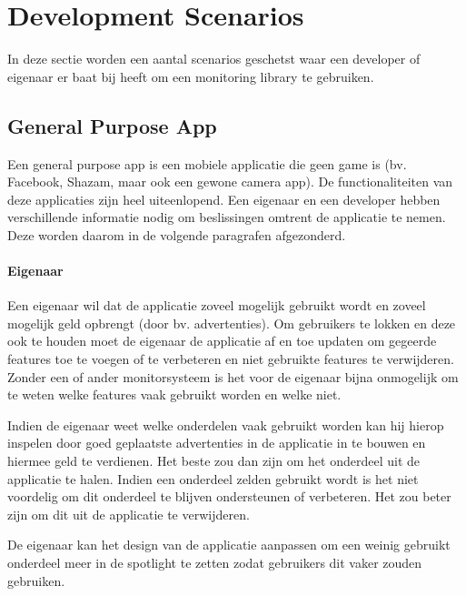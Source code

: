 \section{Development Scenarios}
In deze sectie worden een aantal scenarios geschetst waar een developer of eigenaar er baat bij heeft om een monitoring library te gebruiken. 

\subsection{General Purpose App}
Een general purpose app is een mobiele applicatie die geen game is (bv. Facebook, Shazam, maar ook een gewone camera app). De functionaliteiten van deze applicaties zijn heel uiteenlopend. Een eigenaar en een developer hebben verschillende informatie nodig om beslissingen omtrent de applicatie te nemen. Deze worden daarom in de volgende paragrafen afgezonderd.

\paragraph{Eigenaar}
Een eigenaar wil dat de applicatie zoveel mogelijk gebruikt wordt en zoveel mogelijk geld opbrengt (door bv. advertenties). Om gebruikers te lokken en deze ook te houden moet de eigenaar de applicatie af en toe updaten om gegeerde features toe te voegen of te verbeteren en niet gebruikte features te verwijderen. Zonder een of ander monitorsysteem is het voor de eigenaar bijna onmogelijk om te weten welke features vaak gebruikt worden en welke niet. 

Indien de eigenaar weet welke onderdelen vaak gebruikt worden kan hij hierop inspelen door goed geplaatste advertenties in de applicatie in te bouwen en hiermee geld te verdienen. Het beste zou dan zijn om het onderdeel uit de applicatie te halen. Indien een onderdeel zelden gebruikt wordt is het niet voordelig om dit onderdeel te blijven ondersteunen of verbeteren. Het zou beter zijn om dit uit de applicatie te verwijderen.

De eigenaar kan het design van de applicatie aanpassen om een weinig gebruikt onderdeel meer in de spotlight te zetten zodat gebruikers dit vaker zouden gebruiken. \\


